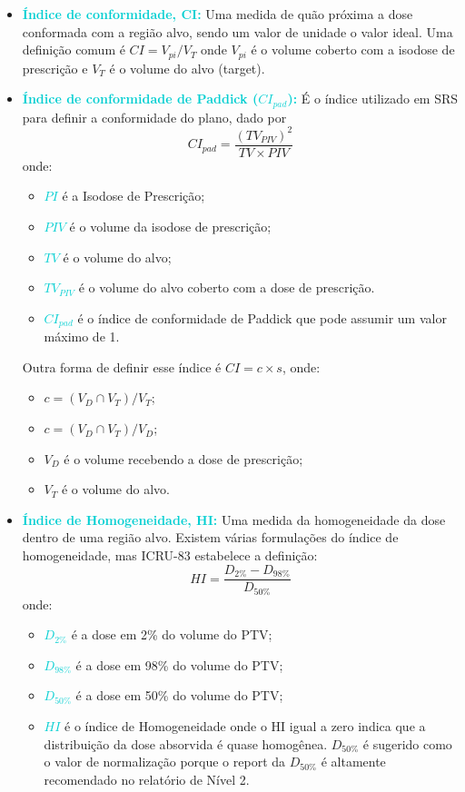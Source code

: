 \documentclass[11pt,a4paper]{article}
\begin{document}
	\begin{itemize}[label=\textcolor{CarnationPink}{$\blacktriangleright$}]
		\item \textcolor{DarkTurquoise}{\textbf{Índice de conformidade, CI:}} Uma medida de quão próxima a dose conformada com a região alvo, sendo um valor de unidade o valor ideal. Uma definição comum é $CI = V_{pi}/V_{T}$ onde $V_{pi}$ é o volume coberto com a isodose de prescrição e $V_{T}$ é o volume do alvo (target).
		\item \textcolor{DarkTurquoise}{\textbf{Índice de conformidade de Paddick ($CI_{pad}$):}} É o índice utilizado em SRS para definir a conformidade do plano, dado por $$CI_{pad} = \frac{(TV_{PIV})^2}{TV \times PIV}$$ onde:
			\begin{itemize}[label=\textcolor{CarnationPink}{$\star$}]
				\item \textcolor{DarkTurquoise}{$PI$} é a Isodose de Prescrição;
				\item \textcolor{DarkTurquoise}{$PIV$} é o volume da isodose de prescrição;
				\item \textcolor{DarkTurquoise}{$TV$} é o volume do alvo;
				\item \textcolor{DarkTurquoise}{$TV_{PIV}$} é o volume do alvo coberto com a dose de prescrição.
				\item \textcolor{DarkTurquoise}{$CI_{pad}$} é o índice de conformidade de Paddick que pode assumir um valor máximo de 1. 
			\end{itemize}
		
		Outra forma de definir esse índice é $CI = c \times s$, onde:
			\begin{itemize}[label=\textcolor{CarnationPink}{$\star$}]
				\item $c = (V_D \cap V_T) / V_T$;
				\item $c = (V_D \cap V_T) / V_D$;
				\item $V_D$ é o volume recebendo a dose de prescrição;
				\item $V_T$ é o volume do alvo.
			\end{itemize}

		\item \textcolor{DarkTurquoise}{\textbf{Índice de Homogeneidade, HI:}} Uma medida da homogeneidade da dose dentro de uma região alvo. Existem várias formulações do índice de homogeneidade, mas ICRU-83 estabelece a definição: $$HI = \frac{D_{2\%} - D_{98\%}}{D_{50\%}}$$ onde:
			\begin{itemize}[label=\textcolor{CarnationPink}{$\star$}]
				\item \textcolor{DarkTurquoise}{$D_{2\%}$} é a dose em 2\% do volume do PTV;
				\item \textcolor{DarkTurquoise}{$D_{98\%}$} é a dose em 98\% do volume do PTV;
				\item \textcolor{DarkTurquoise}{$D_{50\%}$} é a dose em 50\% do volume do PTV;
				\item \textcolor{DarkTurquoise}{$HI$} é o índice de Homogeneidade onde o HI igual a zero indica que a distribuição da dose absorvida é quase homogênea. $D_{50\%}$ é sugerido como o valor de normalização porque o report da $D_{50\%}$ é altamente recomendado no relatório de Nível 2.
			\end{itemize}


\end{itemize}
\end{document}
